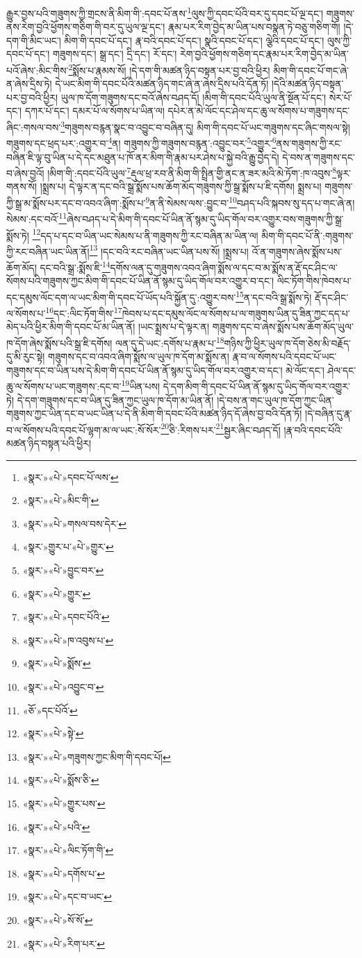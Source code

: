 རྒྱུར་བྱས་པའི་གཟུགས་ཀྱི་གྲངས་ནི་མིག་གི་:དབང་པོ་ནས་\footnote{«སྣར་»«པེ་»དབང་པོ་ལས་}ལུས་ཀྱི་དབང་པོའི་བར་དུ་དབང་པོ་ལྔ་དང་། གཟུགས་ནས་རེག་བྱའི་ཕྱོགས་གཅིག་གི་བར་དུ་ཡུལ་ལྔ་དང་། རྣམ་པར་རིག་བྱེད་མ་ཡིན་པས་བསྣན་ཏེ་བཅུ་གཅིག་གོ། །དེ་དག་གི་མིང་ཡང་། མིག་གི་དབང་པོ་དང་། རྣ་བའི་དབང་པོ་དང་། སྣའི་དབང་པོ་དང་། ལྕེའི་དབང་པོ་དང་། ལུས་ཀྱི་དབང་པོ་དང་། གཟུགས་དང་། སྒྲ་དང་། དྲི་དང་། རོ་དང་། རེག་བྱའི་ཕྱོགས་གཅིག་དང་རྣམ་པར་རིག་བྱེད་མ་ཡིན་པའོ་ཞེས་:མིང་གིས་\footnote{«སྣར་»«པེ་»མིང་གི་}སྨོས་པ་རྣམས་སོ། །དེ་དག་གི་མཚན་ཉིད་བསྟན་པར་བྱ་བའི་ཕྱིར། མིག་གི་དབང་པོ་གང་ཞེ་ན་ཞེས་དྲིས་ཏེ། དེ་ཡང་མིག་གི་དབང་པོའི་མཚན་ཉིད་གང་ཞེ་ན་ཞེས་དྲིས་པའི་དོན་ཏོ། །དེའི་མཚན་ཉིད་བསྟན་པར་བྱ་བའི་ཕྱིར། ཡུལ་ཁ་དོག་གཟུགས་དང་བའོ་ཞེས་བཤད་དོ། །མིག་གི་དབང་པོའི་ཡུལ་ནི་སྔོན་པོ་དང་། སེར་པོ་དང་། དཀར་པོ་དང་། དམར་པོ་ལ་སོགས་པ་ཡིན་ལ། དཔེར་ན་མེ་ལོང་དང་ཤེལ་དང་ཆུ་ལ་སོགས་པ་གཟུགས་དང་ཞིང་:གསལ་བས་\footnote{«སྣར་»«པེ་»གསལ་བས་དེར་}གཟུགས་བརྙན་སྣང་བ་འབྱུང་བ་བཞིན་དུ། མིག་གི་དབང་པོ་ཡང་གཟུགས་དང་ཞིང་གསལ་སྟེ། གཟུགས་དང་ཕྲད་པར་:འགྱུར་བ་\footnote{«སྣར་»གྱུར་པ་«པེ་»གྱུར་}ན། གཟུགས་ཀྱི་གཟུགས་བརྙན་:འབྱུང་བར་\footnote{«སྣར་»«པེ་»བྱུང་བར་}འགྱུར་\footnote{«སྣར་»«པེ་»གྱུར་}ནས་གཟུགས་ཀྱི་རང་བཞིན་ཇི་ལྟ་བུ་ཡིན་པ་དེ་དང་མཐུན་པ་ཁོ་ནར་མིག་གི་རྣམ་པར་ཤེས་པ་སྐྱེ་བའི་རྒྱུ་བྱེད་དེ། དེ་བས་ན་གཟུགས་དང་བ་ཞེས་བྱའོ། །མིག་གི་:དབང་པོའི་ཡུལ་\footnote{«སྣར་»«པེ་»དབང་པོའི་}རྡུལ་ཕྲ་རབ་ནི་མིག་གི་སྤྲིན་གྱི་ནང་ན་ཟར་མའི་མེ་ཏོག་:ཁ་འབུས་\footnote{«སྣར་»«པེ་»ཁ་འབུས་པ་}ལྟར་གནས་སོ། །སྨྲས་པ། དེ་ལྟར་ན་དང་བའི་སྒྲ་སྨོས་པས་ཆོག་མོད་གཟུགས་ཀྱི་སྒྲ་སྨོས་པ་ཇི་དགོས། སྨྲས་པ། གཟུགས་ཀྱི་སྒྲ་མ་སྨོས་པར་དང་བ་འབའ་ཞིག་:སྨོས་པ་\footnote{«སྣར་»«པེ་»སྨོས་}ན་ནི་སེམས་ལས་:བྱུང་བ་\footnote{«སྣར་»«པེ་»འབྱུང་བ་}བཤད་པའི་སྐབས་སུ་དད་པ་གང་ཞེ་ན། སེམས་:དང་བའོ་\footnote{«ཅོ་»དང་པོའོ་}ཞེས་བཤད་པ་དེ་མིག་གི་དབང་པོ་ཡིན་ནོ་སྙམ་དུ་ཡིད་གོལ་བར་འགྱུར་བས་གཟུགས་ཀྱི་སྒྲ་སྨོས་ཏེ། \footnote{«སྣར་»«པེ་»སྟེ་}དད་པ་དང་བ་ཡིན་ཡང་སེམས་པ་ནི་གཟུགས་ཀྱི་རང་བཞིན་མ་ཡིན་ལ། མིག་གི་དབང་པོ་ནི་:གཟུགས་ཀྱི་རང་བཞིན་ཡང་ཡིན་ནོ།\footnote{«སྣར་»«པེ་»གཟུགས་ཀྱང་མིག་གི་དབང་པོ།} །དང་བའི་རང་བཞིན་ཡང་ཡིན་པས་སོ། །སྨྲས་པ། འོ་ན་གཟུགས་ཞེས་སྨོས་པས་ཆོག་མོད། དང་བའི་སྒྲ་:སྨོས་ཇི་\footnote{«སྣར་»«པེ་»སྨོས་ཅི་}དགོས་ལན་དུ་གཟུགས་འབའ་ཞིག་སྨོས་ལ་དང་བ་མ་སྨོས་ན་རྡོ་དང་ཤིང་ལ་སོགས་པའི་གཟུགས་ཀྱང་མིག་གི་དབང་པོ་ཡིན་ནོ་སྙམ་དུ་ཡིད་གོལ་བར་འགྱུར་བ་དང་། ལིང་ཏོག་གིས་ཁེབས་པ་དང་དམུས་ལོང་དག་ལ་ཡང་མིག་གི་དབང་པོ་ཡོད་པའི་སྐྱོན་དུ་:འགྱུར་བས་\footnote{«སྣར་»«པེ་»གྱུར་པས་}ན་དང་བའི་སྒྲ་སྨོས་ཏེ། རྡོ་དང་ཤིང་ལ་སོགས་པ་\footnote{«སྣར་»«པེ་»པའི་}དང་:ལིང་ཏོག་གིས་\footnote{«སྣར་»«པེ་»ལིང་ཏོག་གི་}ཁེབས་པ་དང་དམུས་ལོང་ལ་སོགས་པ་ལ་གཟུགས་ཡིན་དུ་ཟིན་ཀྱང་དད་པ་མེད་པའི་ཕྱིར་མིག་གི་དབང་པོ་མ་ཡིན་ནོ། །ཡང་སྨྲས་པ་དེ་ལྟར་ན། གཟུགས་དང་བ་ཞེས་སྨོས་པས་ཆོག་མོད་ཡུལ་ཁ་དོག་ཞེས་སྨོས་པའི་སྒྲ་ཇི་དགོས། ལན་དུ་དེ་ཡང་:དགོས་པ་རྣམ་པ་\footnote{«སྣར་»«པེ་»དགོས་པ་}གཉིས་ཀྱི་ཕྱིར་ཡུལ་ཁ་དོག་ཅེས་མི་བརྗོད་དུ་མི་རུང་སྟེ། གཟུགས་དང་བ་འབའ་ཞིག་སྨོས་ལ་ཡུལ་ཁ་དོག་མ་སྨོས་ན། རྣ་བ་ལ་སོགས་པའི་དབང་པོ་ཡང་གཟུགས་དང་བ་ཡིན་པས་དེ་མིག་གི་དབང་པོ་ཡིན་ནོ་སྙམ་དུ་ཡིད་གོལ་བར་འགྱུར་བ་དང་། མེ་ལོང་དང་། ཤེལ་དང་ཆུ་ལ་སོགས་པ་ཡང་གཟུགས་:དང་བ་\footnote{«སྣར་»«པེ་»དང་བ་ཡང་}ཡིན་པས། དེ་དག་མིག་གི་དབང་པོ་ཡིན་ནོ་སྙམ་དུ་ཡིད་གོལ་བར་འགྱུར་ཏེ། དེ་དག་གཟུགས་དང་བ་ཡིན་དུ་ཟིན་ཀྱང་ཡུལ་ཁ་དོག་མ་ཡིན་ནོ། །དེ་བས་ན་གང་ཡུལ་ཁ་དོག་ཀྱང་ཡིན་གཟུགས་ཀྱང་ཡིན་དང་བ་ཡང་ཡིན་པ་དེ་ནི་མིག་གི་དབང་པོའི་མཚན་ཉིད་དོ་ཞེས་བྱ་བའི་དོན་ཏོ། །དེ་བཞིན་དུ་རྣ་བ་ལ་སོགས་པའི་དབང་པོ་ལྷག་མ་ལ་ཡང་:སོ་སོར་\footnote{«སྣར་»«པེ་»སོ་སོ་}ཅི་:རིགས་པར་\footnote{«སྣར་»«པེ་»རིག་པར་}སྦྱར་ཞིང་བཤད་དོ། །རྣ་བའི་དབང་པོའི་མཚན་ཉིད་བསྟན་པའི་ཕྱིར། 